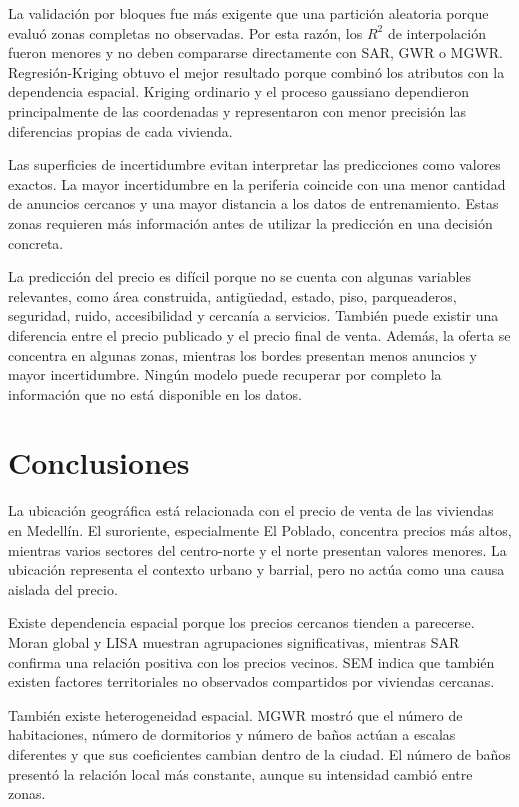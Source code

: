 \documentclass[conference]{IEEEtran}
\begin{document}
La validación por bloques fue más exigente que una partición aleatoria porque evaluó zonas completas no observadas. Por esta razón, los $R^2$ de interpolación fueron menores y no deben compararse directamente con SAR, GWR o MGWR. Regresión-Kriging obtuvo el mejor resultado porque combinó los atributos con la dependencia espacial. Kriging ordinario y el proceso gaussiano dependieron principalmente de las coordenadas y representaron con menor precisión las diferencias propias de cada vivienda.

Las superficies de incertidumbre evitan interpretar las predicciones como valores exactos. La mayor incertidumbre en la periferia coincide con una menor cantidad de anuncios cercanos y una mayor distancia a los datos de entrenamiento. Estas zonas requieren más información antes de utilizar la predicción en una decisión concreta.

La predicción del precio es difícil porque no se cuenta con algunas variables relevantes, como área construida, antigüedad, estado, piso, parqueaderos, seguridad, ruido, accesibilidad y cercanía a servicios. También puede existir una diferencia entre el precio publicado y el precio final de venta. Además, la oferta se concentra en algunas zonas, mientras los bordes presentan menos anuncios y mayor incertidumbre. Ningún modelo puede recuperar por completo la información que no está disponible en los datos.

\FloatBarrier

\balance
\section{Conclusiones}

La ubicación geográfica está relacionada con el precio de venta de las viviendas en Medellín. El suroriente, especialmente El Poblado, concentra precios más altos, mientras varios sectores del centro-norte y el norte presentan valores menores. La ubicación representa el contexto urbano y barrial, pero no actúa como una causa aislada del precio.

Existe dependencia espacial porque los precios cercanos tienden a parecerse. Moran global y LISA muestran agrupaciones significativas, mientras SAR confirma una relación positiva con los precios vecinos. SEM indica que también existen factores territoriales no observados compartidos por viviendas cercanas.

También existe heterogeneidad espacial. MGWR mostró que el número de habitaciones, número de dormitorios y número de baños actúan a escalas diferentes y que sus coeficientes cambian dentro de la ciudad. El número de baños presentó la relación local más constante, aunque su intensidad cambió entre zonas.
\end{document}
